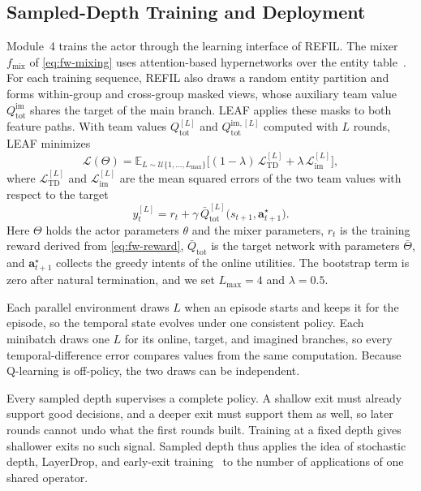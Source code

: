 \subsection{Sampled-Depth Training and Deployment}
\label{subsec:method-training}
Module~4 trains the actor through the learning interface of REFIL. The mixer $f_{\mathrm{mix}}$ of \eqref{eq:fw-mixing} uses attention-based hypernetworks over the entity table~\cite{iqbal2021refil}. For each training sequence, REFIL also draws a random entity partition and forms within-group and cross-group masked views, whose auxiliary team value $Q^{\mathrm{im}}_{\mathrm{tot}}$ shares the target of the main branch. LEAF applies these masks to both feature paths. With team values $Q^{[L]}_{\mathrm{tot}}$ and $Q^{\mathrm{im},[L]}_{\mathrm{tot}}$ computed with $L$ rounds, LEAF minimizes
\begin{equation}
\mathcal L(\Theta)=\mathbb E_{L\sim\mathcal U\{1,\dots,L_{\max}\}}\Big[(1-\lambda)\,\mathcal L^{[L]}_{\mathrm{TD}}+\lambda\,\mathcal L^{[L]}_{\mathrm{im}}\Big],
\label{eq:loss}
\end{equation}
where $\mathcal L^{[L]}_{\mathrm{TD}}$ and $\mathcal L^{[L]}_{\mathrm{im}}$ are the mean squared errors of the two team values with respect to the target
\begin{equation}
y^{[L]}_t=r_t+\gamma\,\bar Q^{[L]}_{\mathrm{tot}}\big(s_{t+1},\mathbf a^{\star}_{t+1}\big).
\label{eq:target}
\end{equation}
Here $\Theta$ holds the actor parameters $\theta$ and the mixer parameters, $r_t$ is the training reward derived from \eqref{eq:fw-reward}, $\bar Q_{\mathrm{tot}}$ is the target network with parameters $\bar\Theta$, and $\mathbf a^{\star}_{t+1}$ collects the greedy intents of the online utilities. The bootstrap term is zero after natural termination, and we set $L_{\max}=4$ and $\lambda=0.5$.

Each parallel environment draws $L$ when an episode starts and keeps it for the episode, so the temporal state evolves under one consistent policy. Each minibatch draws one $L$ for its online, target, and imagined branches, so every temporal-difference error compares values from the same computation. Because Q-learning is off-policy, the two draws can be independent.

Every sampled depth supervises a complete policy. A shallow exit must already support good decisions, and a deeper exit must support them as well, so later rounds cannot undo what the first rounds built. Training at a fixed depth gives shallower exits no such signal. Sampled depth thus applies the idea of stochastic depth, LayerDrop, and early-exit training~\cite{huang2016stochastic,fan2020layerdrop,teerapittayanon2016branchynet,kaya2019overthinking} to the number of applications of one shared operator.

